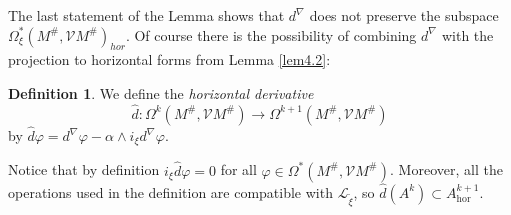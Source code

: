 \documentclass[12pt,a4paper]{amsart}
\def\Cal{\mathcal}
\let\phi\varphi
\newcommand{\al}{\alpha}
\newcommand{\ph}{\phi}
\newcommand{\Om}{\Omega}
\newcommand{\hor}{\text{hor}}
\newcounter{theorem}
\numberwithin{theorem}{section}
\theoremstyle{definition}
\newtheorem{definition}[theorem]{Definition}
\theoremstyle{remark}
\begin{document}
The last statement of the Lemma shows that $d^\nabla$ does not
preserve the subspace $\Om^*_\xi(M^\#,\Cal VM^\#)_{hor}$. Of course
there is the possibility of combining $d^\nabla$ with the projection
to horizontal forms from Lemma \ref{lem4.2}:

\begin{definition}\label{def4.3}
We define the \textit{horizontal derivative} 
$$
\hat d:\Om^k(M^\#,\Cal VM^\#)\to \Om^{k+1}(M^\#,\Cal VM^\#)
$$
by $\hat d\ph=d^\nabla\ph-\al\wedge i_\xi d^\nabla\ph$. 
\end{definition}

Notice that by definition $i_\xi\hat d\ph=0$ for all
$\ph\in\Om^*(M^\#,\Cal VM^\#)$. Moreover, all the operations used in
the definition are compatible with $\Cal L_{\tilde\xi}$, so $\hat d
(A^k)\subset A^{k+1}_\hor$.
\end{document}

